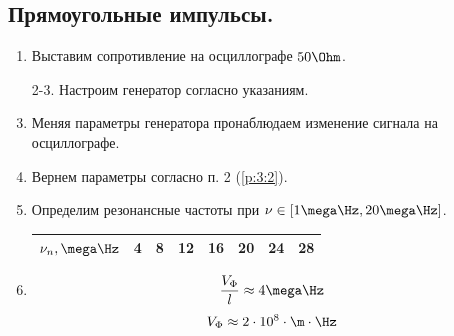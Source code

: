 \documentclass{report}
\begin{document}
\subsection{Прямоугольные импульсы.}
\begin{enumerate}
	\item Выставим сопротивление на осциллографе $ 50 \Ohm $.
	\item[2-3.] \label{p:3:2} Настроим генератор согласно указаниям.
	      \setcounter{enumi}{3}
	\item Меняя параметры генератора пронаблюдаем изменение сигнала на осциллографе.
	\item Вернем параметры согласно п. 2 (\ref{p:3:2}).
	\item Определим резонансные частоты при $ \nu \in [1 \mega\Hz, 20 \mega\Hz] $.
	      \begin{table}[H]
		      \centering
		      \begin{tabular}{|l|l|l|l|l|l|l|l|}
			      \hline
			      $ \nu_n, \mega\Hz $ & 4 & 8 & 12 & 16 & 20 & 24 & 28 \\
			      \hline
		      \end{tabular}
	      \end{table}
	\item
	      \begin{equation}
		      \frac{V_\Phi}{l} \approx 4 \mega\Hz
	      \end{equation}
	      \begin{equation}
		      V_\Phi \approx 2 \cdot 10^{8} \cdot \m \cdot \Hz
	      \end{equation}
\end{enumerate}
\end{document}
